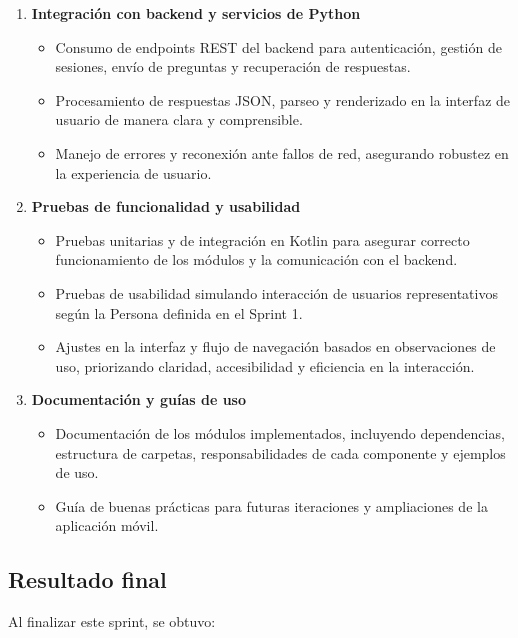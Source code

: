 \begin{enumerate}
      \item \textbf{Integración con backend y servicios de Python}
            \begin{itemize}
                  \item Consumo de endpoints REST del backend para autenticación, gestión de sesiones,
                        envío de preguntas y recuperación de respuestas.
                  \item Procesamiento de respuestas JSON, parseo y renderizado en la interfaz de
                        usuario de manera clara y comprensible.
                  \item Manejo de errores y reconexión ante fallos de red, asegurando robustez en la
                        experiencia de usuario.
            \end{itemize}

      \item \textbf{Pruebas de funcionalidad y usabilidad}
            \begin{itemize}
                  \item Pruebas unitarias y de integración en Kotlin para asegurar correcto
                        funcionamiento de los módulos y la comunicación con el backend.
                  \item Pruebas de usabilidad simulando interacción de usuarios representativos según
                        la Persona definida en el Sprint 1.
                  \item Ajustes en la interfaz y flujo de navegación basados en observaciones de uso,
                        priorizando claridad, accesibilidad y eficiencia en la interacción.
            \end{itemize}

      \item \textbf{Documentación y guías de uso}
            \begin{itemize}
                  \item Documentación de los módulos implementados, incluyendo dependencias, estructura
                        de carpetas, responsabilidades de cada componente y ejemplos de uso.
                  \item Guía de buenas prácticas para futuras iteraciones y ampliaciones de la
                        aplicación móvil.
            \end{itemize}
\end{enumerate}

\subsection{Resultado final}
Al finalizar este sprint, se obtuvo:

